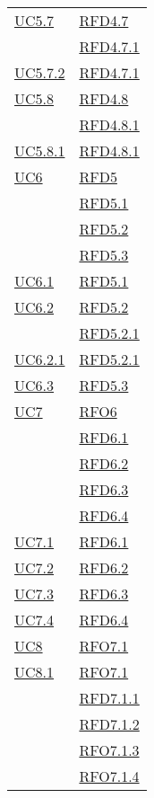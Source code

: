 \begin{longtable}{|>{\centering}m{5cm}|m{5cm}<{\centering}|}
\hyperref[UC5.7]{UC5.7} & \hyperlink{RFD4.7}{RFD4.7}\\
& \hyperlink{RFD4.7.1}{RFD4.7.1}\\ \hline
\hyperref[UC5.7.2]{UC5.7.2} & \hyperlink{RFD4.7.1}{RFD4.7.1}\\ \hline
\hyperref[UC5.8]{UC5.8} & \hyperlink{RFD4.8}{RFD4.8}\\
& \hyperlink{RFD4.8.1}{RFD4.8.1}\\ \hline
\hyperref[UC5.8.1]{UC5.8.1} & \hyperlink{RFD4.8.1}{RFD4.8.1}\\ \hline
\hyperref[UC6]{UC6} & \hyperlink{RFD5}{RFD5}\\
& \hyperlink{RFD5.1}{RFD5.1}\\
& \hyperlink{RFD5.2}{RFD5.2}\\
& \hyperlink{RFD5.3}{RFD5.3}\\ \hline
\hyperref[UC6.1]{UC6.1} & \hyperlink{RFD5.1}{RFD5.1}\\ \hline
\hyperref[UC6.2]{UC6.2} & \hyperlink{RFD5.2}{RFD5.2}\\
& \hyperlink{RFD5.2.1}{RFD5.2.1}\\ \hline
\hyperref[UC6.2.1]{UC6.2.1} & \hyperlink{RFD5.2.1}{RFD5.2.1}\\ \hline
\hyperref[UC6.3]{UC6.3} & \hyperlink{RFD5.3}{RFD5.3}\\ \hline
\hyperref[UC7]{UC7} & \hyperlink{RFO6}{RFO6}\\
& \hyperlink{RFD6.1}{RFD6.1}\\
& \hyperlink{RFD6.2}{RFD6.2}\\
& \hyperlink{RFD6.3}{RFD6.3}\\
& \hyperlink{RFD6.4}{RFD6.4}\\ \hline
\hyperref[UC7.1]{UC7.1} & \hyperlink{RFD6.1}{RFD6.1}\\ \hline
\hyperref[UC7.2]{UC7.2} & \hyperlink{RFD6.2}{RFD6.2}\\ \hline
\hyperref[UC7.3]{UC7.3} & \hyperlink{RFD6.3}{RFD6.3}\\ \hline
\hyperref[UC7.4]{UC7.4} & \hyperlink{RFD6.4}{RFD6.4}\\ \hline
\hyperref[UC8]{UC8} & \hyperlink{RFO7.1}{RFO7.1}\\ \hline
\hyperref[UC8.1]{UC8.1} & \hyperlink{RFO7.1}{RFO7.1}\\
& \hyperlink{RFD7.1.1}{RFD7.1.1}\\
& \hyperlink{RFD7.1.2}{RFD7.1.2}\\
& \hyperlink{RFO7.1.3}{RFO7.1.3}\\
& \hyperlink{RFO7.1.4}{RFO7.1.4}\\

\end{longtable}
